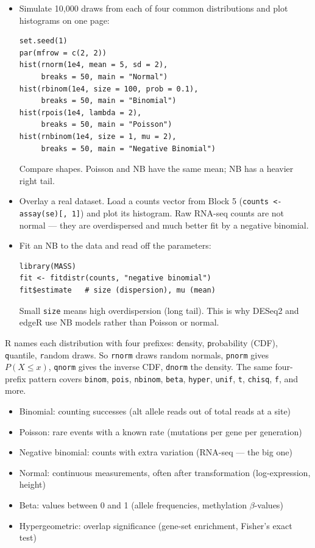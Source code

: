 \begin{itemize}[nosep]
  \item Simulate 10{,}000 draws from each of four common distributions and plot histograms on one page:
    \begin{lstlisting}
set.seed(1)
par(mfrow = c(2, 2))
hist(rnorm(1e4, mean = 5, sd = 2),
     breaks = 50, main = "Normal")
hist(rbinom(1e4, size = 100, prob = 0.1),
     breaks = 50, main = "Binomial")
hist(rpois(1e4, lambda = 2),
     breaks = 50, main = "Poisson")
hist(rnbinom(1e4, size = 1, mu = 2),
     breaks = 50, main = "Negative Binomial")
    \end{lstlisting}
    Compare shapes. Poisson and NB have the same mean; NB has a heavier right tail.
  \item Overlay a real dataset. Load a counts vector from Block 5 (\texttt{counts <- assay(se)[, 1]}) and plot its histogram. Raw RNA-seq counts are not normal --- they are overdispersed and much better fit by a negative binomial.
  \item Fit an NB to the data and read off the parameters:
    \begin{lstlisting}
library(MASS)
fit <- fitdistr(counts, "negative binomial")
fit$estimate   # size (dispersion), mu (mean)
    \end{lstlisting}
    Small \texttt{size} means high overdispersion (long tail). This is why DESeq2 and edgeR use NB models rather than Poisson or normal.
\end{itemize}
\begin{tipbox}
R names each distribution with four prefixes: \texttt{d}ensity, \texttt{p}robability (CDF), \texttt{q}uantile, \texttt{r}andom draws. So \texttt{rnorm} draws random normals, \texttt{pnorm} gives $P(X \leq x)$, \texttt{qnorm} gives the inverse CDF, \texttt{dnorm} the density. The same four-prefix pattern covers \texttt{binom}, \texttt{pois}, \texttt{nbinom}, \texttt{beta}, \texttt{hyper}, \texttt{unif}, \texttt{t}, \texttt{chisq}, \texttt{f}, and more.
\begin{itemize}[nosep]
  \item Binomial: counting successes (alt allele reads out of total reads at a site)
  \item Poisson: rare events with a known rate (mutations per gene per generation)
  \item Negative binomial: counts with extra variation (RNA-seq --- the big one)
  \item Normal: continuous measurements, often after transformation (log-expression, height)
  \item Beta: values between 0 and 1 (allele frequencies, methylation $\beta$-values)
  \item Hypergeometric: overlap significance (gene-set enrichment, Fisher's exact test)
\end{itemize}
\end{tipbox}
